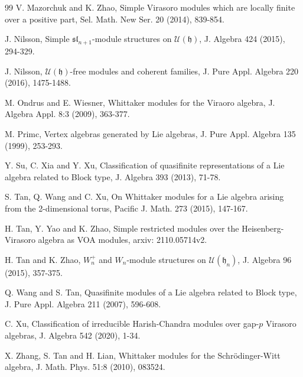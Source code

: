 \documentclass[12pt, reqno]{amsart}
\numberwithin{equation}{section}
\numberwithin{equation}{section}
\def\h{\mathfrak{h}}
\def\U{\mathcal{U}}
\begin{document}
\begin{thebibliography}{99}
V. Mazorchuk and K. Zhao,
Simple Virasoro modules which are locally finite over a positive part,
Sel. Math. New Ser. 20 (2014), 839-854.


J. Nilsson,
Simple $\mathfrak{sl}_{n+1}$-module structures on $\U(\h)$,
J. Algebra 424 (2015), 294-329.


J. Nilsson,
$\U(\h)$-free modules and coherent families,
J. Pure Appl. Algebra 220 (2016), 1475-1488.


M. Ondrus and E. Wiesner,
Whittaker modules for the Viraoro algebra,
J. Algebra Appl. 8:3 (2009), 363-377.

M. Primc,
Vertex algebras generated by Lie algebras,  {J. Pure Appl. Algebra} {135} (1999), 253-293.


Y. Su, C. Xia and Y. Xu,
Classification of quasifinite representations of a Lie algebra related to Block type,
J. Algebra 393 (2013), 71-78.


S. Tan, Q. Wang and C. Xu,
On Whittaker modules for a Lie algebra arising from the 2-dimensional torus,
Pacific J. Math. 273 (2015), 147-167.


H. Tan, Y. Yao and K. Zhao,
Simple restricted modules over the Heisenberg-Virasoro algebra as VOA modules,
arxiv: 2110.05714v2.


H. Tan and K. Zhao,
$W_n^+$ and $W_n$-module structures on $\U(\h_n)$,
J. Algebra 96 (2015), 357-375.


Q. Wang and S. Tan,
Quasifinite modules of a Lie algebra related to Block type,
J. Pure Appl. Algebra 211 (2007), 596-608.


C. Xu,
Classification of irreducible Harish-Chandra modules over gap-$p$ Virasoro algebras,
J. Algebra 542 (2020), 1-34.


X. Zhang, S. Tan and H. Lian,
Whittaker modules for the Schr{\"o}dinger-Witt algebra,
J. Math. Phys. 51:8 (2010), 083524.


\end{thebibliography}
\end{document}

